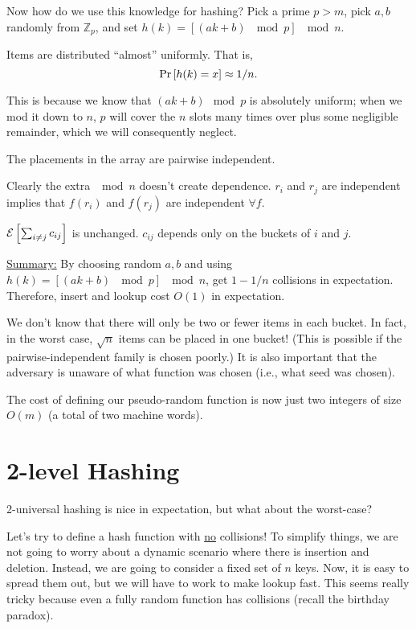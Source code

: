 \documentclass{article}
\renewcommand{\Pr}[1]{\textnormal{Pr}\left[ #1 \right]}
\begin{document}
Now how do we use this knowledge for hashing?  Pick a prime $p > m$, pick $a,b$ randomly from ${\mathbb Z}_p$, and set $h(k) = [(ak+b)\ \mod p]\ \mod n$.

\begin{claim}
  Items are distributed ``almost'' uniformly.  That is,
$$\Pr{h(k) = x} \approx 1/n.$$
\end{claim}

This is because we know that $(ak+b)\mod p$ is absolutely uniform; when we mod it down to $n$, $p$ will cover the $n$ slots many times over plus some negligible remainder, which we will consequently neglect.

\begin{claim}
  The placements in the array are pairwise independent.
\end{claim}

Clearly the extra $\mod n$ doesn't create dependence.  $r_i$ and $r_j$ are independent implies that $f(r_i)$ and $f(r_j)$ are independent $\forall f$.

\begin{claim}
  ${\cal E}\left[\sum_{i\not=j} c_{ij}\right]$ is unchanged.  $c_{ij}$ depends only on the buckets of $i$ and $j$.
\end{claim}

\underline{Summary:} By choosing random $a,b$ and using $h(k) = [(ak+b)\ \mod p]\ \mod n$, get $1-1/n$ collisions in expectation.  Therefore, insert and lookup cost $O(1)$ in expectation.

We don't know that there will only be two or fewer items in each bucket.  In fact, in the worst case, $\sqrt{n}$ items can be placed in one bucket!  (This is possible if the pairwise-independent family is chosen poorly.)  It is also important that the adversary is unaware of what function was chosen (i.e., what seed was chosen).

The cost of defining our pseudo-random function is now just two integers of size $O(m)$ (a total of two machine words).

\section{2-level Hashing}

2-universal hashing is nice in expectation, but what about the worst-case?

Let's try to define a hash function with \underline{no} collisions!  To simplify things, we are not going to worry about a dynamic scenario where there is insertion and deletion.  Instead, we are going to consider a fixed set of $n$ keys.  Now, it is easy to spread them out, but we will have to work to make lookup fast.  This seems really tricky because even a fully random function has collisions (recall the birthday paradox).
\end{document}
